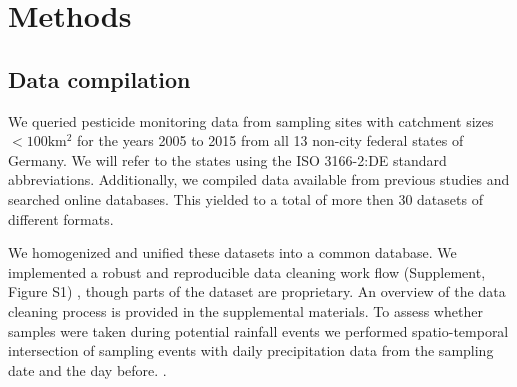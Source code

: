 \documentclass[journal=esthag,manuscript=article]{achemso}
\begin{document}
\section{Methods}
\subsection{Data compilation}

We queried pesticide monitoring data from sampling sites with catchment sizes $\mathrm{< 100km^2}$ for the years 2005 to 2015 from all 13 non-city federal states of Germany. We will refer to the states using the ISO 3166-2:DE standard abbreviations.
Additionally, we compiled data available from previous studies and searched online databases.
%
%
This yielded to a total of more then 30 datasets of different formats.
%
%

We homogenized and unified these datasets into a common database.
We implemented a robust and reproducible data cleaning work flow (Supplement, Figure S1) \citep{poisot_best_2015}, though parts of the dataset are proprietary.
%
%
An overview of the data cleaning process is provided in the supplemental materials.  
%
%
To assess whether samples were taken during potential rainfall events we performed spatio-temporal intersection of sampling events with daily precipitation data from the sampling date and the day before. \citep{rauthe_central_2013}.
%
%
%
\end{document}
